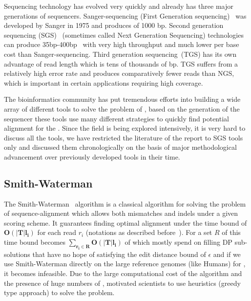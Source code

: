 \bigbreak

Sequencing technology has evolved very quickly and already has three major generations of sequencers. Sanger-sequencing (First Generation sequencing)~\citep{sanger1975rapid} was developed by Sanger in 1975 and produces \reads of 1000 bp. Second generation sequencing (SGS)~\citep{reis2009next} (sometimes called Next Generation Sequencing) technologies can produce 35bp-400bp~\citep{schatz2010assembly} \reads with very high throughput and much lower per base cost than Sanger-sequencing. Third generation sequencing~\citep{schadt2010window}(TGS) has its own advantage of read length which is tens of thousands of bp. TGS suffers from a relatively high error rate and produces comparatively fewer reads than NGS, which is important in certain applications requiring high coverage. 

The bioinformatics community has put tremendous efforts into building a wide array of different tools to solve the problem of \ra, based on the generation of the sequencer these tools use many different strategies to quickly find potential alignment for the \reads. Since the field is being explored intensively, it is very hard to discuss all the tools, we have restricted the literature of the report to SGS tools only and discussed them chronologically on the basis of major methodological advancement over previously developed tools in their time.

\subsection{Smith-Waterman~\citep{smith1981identification}}
The Smith-Waterman~\citep{smith1981identification} algorithm is a classical algorithm for solving the problem of sequence-alignment which allows both mismatches and indels under a given scoring scheme. It guarantees finding optimal alignment under the time bound of $\bm{O(|T|l_i)}$ for each read $r_i$ (notations as described before~). For a set $R$ of \reads this time bound becomes $\bm{\sum_{r_i \in R}O(|T|l_i)}$ of which mostly spend on filling DP sub-solutions that have no hope of satisfying the edit distance bound of $\epsilon$ and if we use Smith-Waterman directly on the large reference genomes (like Humans) for \ra, it becomes infeasible. Due to the large computational cost of the algorithm and the presence of huge numbers of \reads, motivated scientists to use heuristics (greedy type approach) to solve the problem.

